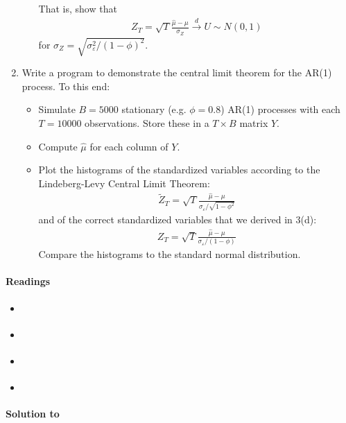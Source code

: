 \begin{enumerate}
\begin{enumerate}
	That is, show that
	\begin{align*}
	Z_{T} =\sqrt{T}\frac{\hat{\mu} -\mu }{\sigma_Z} \overset{d}{\rightarrow} U \sim N(0,1)
	\end{align*}
	for $\sigma_Z=\sqrt{\sigma_\varepsilon^2/(1-\phi)^2}$.
\end{enumerate}
\item Write a program to demonstrate the central limit theorem for the AR(1) process. To this end:
\begin{itemize}
	\item Simulate $B=5000$ stationary (e.g. $\phi=0.8$) AR(1) processes with each $T=10000$ observations.
	Store these in a $T \times B$ matrix $Y$.
	\item Compute $\hat{\mu}$ for each column of $Y$.
	\item Plot the histograms of the standardized variables according to the Lindeberg-Levy Central Limit Theorem:
	\begin{align*}
	\widetilde{Z}_T = \sqrt{T}\frac{\hat{\mu}-\mu}{\sigma_{\varepsilon }/\sqrt{1-\phi^2}}
	\end{align*}
	and of the correct standardized variables that we derived in 3(d):
	\begin{align*}
	Z_T = \sqrt{T}\frac{\hat{\mu}-\mu}{\sigma_{\varepsilon }/(1-\phi)}
	\end{align*}
	Compare the histograms to the standard normal distribution.
\end{itemize}
\end{enumerate}

\paragraph{Readings}
\begin{itemize}
	\item \textcite{Crack.Ledoit_2010_CentralLimitTheorems}
	\item \textcite[App. C]{Lutkepohl_2005_NewIntroductionMultiple}
	\item \textcite[App. C]{Neusser_2016_TimeSeriesEconometrics}
	\item \textcite[Ch. 5]{White_2001_AsymptoticTheoryEconometricians}
\end{itemize}

\begin{solution}\textbf{Solution to }
\ifDisplaySolutions

\fi
\newpage
\end{solution}